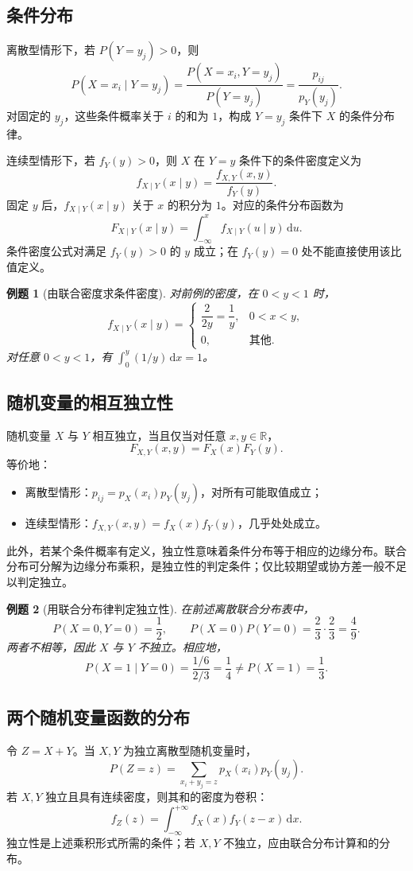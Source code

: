 \documentclass[11pt,a4paper,fontset=fandol]{ctexart}
\newtheorem{example}{例题}[section]
\theoremstyle{remark}
\begin{document}
\subsection{条件分布}
离散型情形下，若 $P(Y=y_j)>0$，则
\[
    P(X=x_i\mid Y=y_j)
    =\frac{P(X=x_i,Y=y_j)}{P(Y=y_j)}
    =\frac{p_{ij}}{p_Y(y_j)}.
\]
对固定的 $y_j$，这些条件概率关于 $i$ 的和为 $1$，构成 $Y=y_j$ 条件下 $X$ 的条件分布律。

连续型情形下，若 $f_Y(y)>0$，则 $X$ 在 $Y=y$ 条件下的条件密度定义为
\[
    f_{X\mid Y}(x\mid y)=\frac{f_{X,Y}(x,y)}{f_Y(y)}.
\]
固定 $y$ 后，$f_{X\mid Y}(x\mid y)$ 关于 $x$ 的积分为 $1$。对应的条件分布函数为
\[
    F_{X\mid Y}(x\mid y)=\int_{-\infty}^{x}f_{X\mid Y}(u\mid y)\,\mathrm{d}u.
\]
条件密度公式对满足 $f_Y(y)>0$ 的 $y$ 成立；在 $f_Y(y)=0$ 处不能直接使用该比值定义。

\begin{example}[由联合密度求条件密度]
对前例的密度，在 $0<y<1$ 时，
\[
    f_{X\mid Y}(x\mid y)=
    \begin{cases}
        \dfrac{2}{2y}=\dfrac1y,&0<x<y,\\
        0,&\text{其他}.
    \end{cases}
\]
对任意 $0<y<1$，有 $\int_0^y(1/y)\,\mathrm{d}x=1$。
\end{example}

\subsection{随机变量的相互独立性}
随机变量 $X$ 与 $Y$ 相互独立，当且仅当对任意 $x,y\in\mathbb{R}$，
\[
    F_{X,Y}(x,y)=F_X(x)F_Y(y).
\]
等价地：
\begin{itemize}
    \item 离散型情形：$p_{ij}=p_X(x_i)p_Y(y_j)$，对所有可能取值成立；
    \item 连续型情形：$f_{X,Y}(x,y)=f_X(x)f_Y(y)$，几乎处处成立。
\end{itemize}
此外，若某个条件概率有定义，独立性意味着条件分布等于相应的边缘分布。联合分布可分解为边缘分布乘积，是独立性的判定条件；仅比较期望或协方差一般不足以判定独立。

\begin{example}[用联合分布律判定独立性]
在前述离散联合分布表中，
\[
    P(X=0,Y=0)=\frac12,\qquad
    P(X=0)P(Y=0)=\frac23\cdot\frac23=\frac49.
\]
两者不相等，因此 $X$ 与 $Y$ 不独立。相应地，
\[
    P(X=1\mid Y=0)=\frac{1/6}{2/3}=\frac14
    \ne P(X=1)=\frac13.
\]
\end{example}

\subsection{两个随机变量函数的分布}
令 $Z=X+Y$。当 $X,Y$ 为独立离散型随机变量时，
\[
    P(Z=z)=\sum_{x_i+y_j=z}p_X(x_i)p_Y(y_j).
\]
若 $X,Y$ 独立且具有连续密度，则其和的密度为卷积：
\[
    f_Z(z)=\int_{-\infty}^{+\infty}f_X(x)f_Y(z-x)\,\mathrm{d}x.
\]
独立性是上述乘积形式所需的条件；若 $X,Y$ 不独立，应由联合分布计算和的分布。
\end{document}
